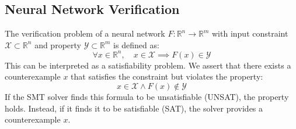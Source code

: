 \subsection{Neural Network Verification}
The verification problem of a neural network $F: \mathbb{R}^n \to \mathbb{R}^m$ with input constraint
$\mathcal{X} \subset \mathbb{R}^n$ and property $\mathcal{Y} \subset \mathbb{R}^m$ is defined as:
\begin{equation}
    \forall x \in \mathbb{R}^n, \quad x \in \mathcal{X} \implies F(x) \in \mathcal{Y}
\end{equation}
This can be interpreted as a satisfiability problem. We assert that there exists a counterexample $x$
that satisfies the constraint but violates the property:
\begin{equation}
    x \in \mathcal{X} \land F(x) \notin \mathcal{Y}
\end{equation}
If the SMT solver finds this formula to be unsatisfiable (UNSAT), the property holds. Instead, if it
finds it to be satisfiable (SAT), the solver provides a counterexample $x$.
